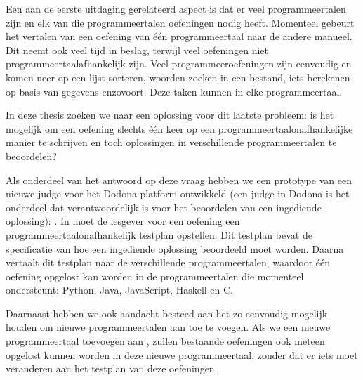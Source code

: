 Een aan de eerste uitdaging gerelateerd aspect is dat er veel programmeertalen zijn en elk van die programmeertalen oefeningen nodig heeft.
Momenteel gebeurt het vertalen van een oefening van één programmeertaal naar de andere manueel.
Dit neemt ook veel tijd in beslag, terwijl veel oefeningen niet programmeertaalafhankelijk zijn.
Veel programmeeroefeningen zijn eenvoudig en komen neer op een lijst sorteren, woorden zoeken in een bestand, iets berekenen op basis van gegevens enzovoort.
Deze taken kunnen in elke programmeertaal.

In deze thesis zoeken we naar een oplossing voor dit laatste probleem: is het mogelijk om een oefening slechts één keer op een programmeertaalonafhankelijke manier te schrijven en toch oplossingen in verschillende programmeertalen te beoordelen?

Als onderdeel van het antwoord op deze vraag hebben we een prototype van een nieuwe judge voor het Dodona-platform ontwikkeld (een judge in Dodona is het onderdeel dat verantwoordelijk is voor het beoordelen van een ingediende oplossing): \tested{}.
In \tested{} moet de lesgever voor een oefening een programmeertaalonafhankelijk testplan opstellen.
Dit testplan bevat de specificatie van hoe een ingediende oplossing beoordeeld moet worden.
Daarna vertaalt \tested{} dit testplan naar de verschillende programmeertalen, waardoor één oefening opgelost kan worden in de programmeertalen die \tested{} momenteel ondersteunt: Python, Java, JavaScript, Haskell en C.\@

Daarnaast hebben we ook aandacht besteed aan het zo eenvoudig mogelijk houden om nieuwe programmeertalen aan \tested{} toe te voegen.
Als we een nieuwe programmeertaal toevoegen aan \tested{}, zullen bestaande oefeningen ook meteen opgelost kunnen worden in deze nieuwe programmeertaal, zonder dat er iets moet veranderen aan het testplan van deze oefeningen.